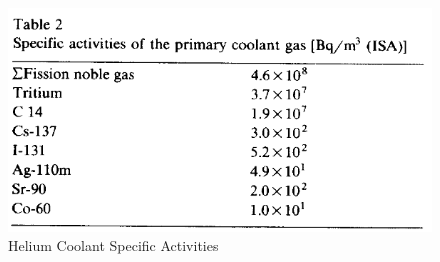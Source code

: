 \begin{figure}[h!]
\centering
\includegraphics[width=0.7\linewidth]{figures/gas-act-tab}
\caption{Helium Coolant Specific Activities \cite{noauthor_results_1990}}
\label{fig:gas-act-tab}
\end{figure}